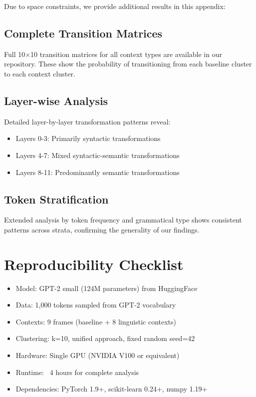 \documentclass[11pt]{article}
\begin{document}
Due to space constraints, we provide additional results in this appendix:

\subsection{Complete Transition Matrices}
Full 10×10 transition matrices for all context types are available in our repository. These show the probability of transitioning from each baseline cluster to each context cluster.

\subsection{Layer-wise Analysis}
Detailed layer-by-layer transformation patterns reveal:
\begin{itemize}
\item Layers 0-3: Primarily syntactic transformations
\item Layers 4-7: Mixed syntactic-semantic transformations  
\item Layers 8-11: Predominantly semantic transformations
\end{itemize}

\subsection{Token Stratification}
Extended analysis by token frequency and grammatical type shows consistent patterns across strata, confirming the generality of our findings.

\section{Reproducibility Checklist}
\label{sec:reproducibility}

\begin{itemize}
\item[$\checkmark$] Model: GPT-2 small (124M parameters) from HuggingFace
\item[$\checkmark$] Data: 1,000 tokens sampled from GPT-2 vocabulary
\item[$\checkmark$] Contexts: 9 frames (baseline + 8 linguistic contexts)
\item[$\checkmark$] Clustering: k=10, unified approach, fixed random seed=42
\item[$\checkmark$] Hardware: Single GPU (NVIDIA V100 or equivalent)
\item[$\checkmark$] Runtime: ~4 hours for complete analysis
\item[$\checkmark$] Dependencies: PyTorch 1.9+, scikit-learn 0.24+, numpy 1.19+
\end{itemize}
\end{document}
